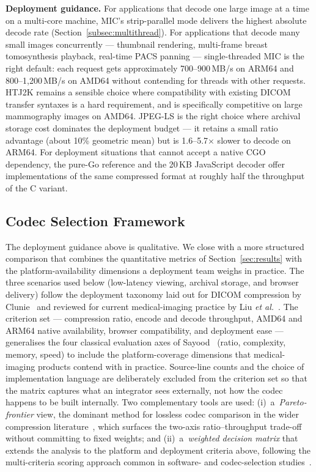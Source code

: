 \documentclass[journal]{IEEEtran}
\begin{document}
\textbf{Deployment guidance.} For applications that decode one large
image at a time on a multi-core machine, MIC's strip-parallel mode
delivers the highest absolute decode rate
(Section~\ref{subsec:multithread}). For applications that decode many
small images concurrently --- thumbnail rendering, multi-frame breast
tomosynthesis playback, real-time PACS panning --- single-threaded MIC
is the right default: each request gets approximately 700--900\,MB/s on
ARM64 and 800--1{,}200\,MB/s on AMD64 without contending for threads
with other requests. HTJ2K remains a sensible choice where compatibility
with existing DICOM transfer syntaxes is a hard requirement, and is
specifically competitive on large mammography images on AMD64. JPEG-LS
is the right choice where archival storage cost dominates the deployment
budget --- it retains a small ratio advantage (about 10\%
geometric mean) but is 1.6--5.7$\times$ slower to decode on ARM64. For
deployment situations that cannot accept a native CGO dependency, the
pure-Go reference and the 20\,KB JavaScript decoder offer
implementations of the same compressed format at roughly half the
throughput of the C variant.

\subsection{Codec Selection Framework}
\label{subsec:selection-framework}

The deployment guidance above is qualitative. We close with a more
structured comparison that combines the quantitative metrics of
Section~\ref{sec:results} with the platform-availability dimensions a
deployment team weighs in practice. The three scenarios used below
(low-latency viewing, archival storage, and browser delivery) follow
the deployment taxonomy laid out for DICOM compression by
Clunie~\cite{clunie_miit2009} and reviewed for current medical-imaging
practice by Liu \textit{et al.}~\cite{liu2017}. The criterion set ---
compression ratio, encode and decode throughput, AMD64 and ARM64
native availability, browser compatibility, and deployment ease ---
generalises the four classical evaluation axes of
Sayood~\cite{sayood} (ratio, complexity, memory, speed) to include the
platform-coverage dimensions that medical-imaging products contend with
in practice. Source-line counts and the choice of implementation
language are deliberately excluded from the criterion set so that the
matrix captures what an integrator sees externally, not how the codec
happens to be built internally. Two complementary tools are used:
(i)~a~\textit{Pareto-frontier} view, the dominant method for lossless
codec comparison in the wider compression literature~\cite{geldreich_pareto,
jpegxl_pareto, fcbench}, which surfaces the two-axis ratio--throughput
trade-off without committing to fixed weights; and (ii)~a~\textit{weighted
decision matrix} that extends the analysis to the platform and
deployment criteria above, following the multi-criteria scoring approach
common in software- and codec-selection studies~\cite{lossless_unified_score,
saaty_ahp}.
\end{document}

